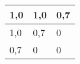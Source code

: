 \documentclass{bschlangaul-aufgabe}
\begin{document}
\begin{enumerate}
\begin{center}
\begin{tabular}{|l|l|l|}
\hline
1,0 & 1,0 & 0,7\\\hline
1,0 & 0,7 & 0\\\hline
0,7 & 0 & 0\\\hline
\end{tabular}
\end{center}

\begin{liAntwort}

\end{liAntwort}

\end{enumerate}
\end{document}

